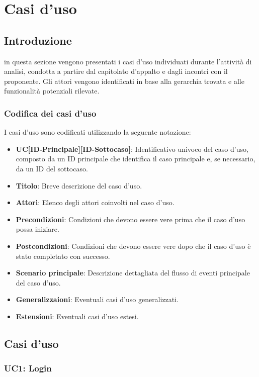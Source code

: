 \section{Casi d'uso}

\subsection{Introduzione}
in questa sezione vengono presentati i casi d'uso individuati durante l'attività di analisi, 
condotta a partire dal capitolato d'appalto e dagli incontri con il proponente. 
Gli attori vengono identificati in base alla gerarchia trovata e 
alle funzionalità potenziali rilevate.

\subsubsection{Codifica dei casi d'uso}
I casi d'uso sono codificati utilizzando la seguente notazione:

\begin{itemize}
    \item \textbf{UC[ID-Principale][ID-Sottocaso]}: Identificativo univoco del caso d'uso, composto da un ID principale che identifica il caso principale e, se necessario, da un ID del sottocaso.
    \item \textbf{Titolo}: Breve descrizione del caso d'uso.
    \item \textbf{Attori}: Elenco degli attori coinvolti nel caso d'uso.
    \item \textbf{Precondizioni}: Condizioni che devono essere vere prima che il caso d'uso possa iniziare.
    \item \textbf{Postcondizioni}: Condizioni che devono essere vere dopo che il caso d'uso è stato completato con successo.
    \item \textbf{Scenario principale}: Descrizione dettagliata del flusso di eventi principale del caso d'uso.
    \item \textbf{Generalizzaioni}: Eventuali casi d'uso generalizzati.
    \item \textbf{Estensioni}: Eventuali casi d'uso estesi.
\end{itemize}

\subsection{Casi d'uso}

\subsubsection{UC1: Login} %

